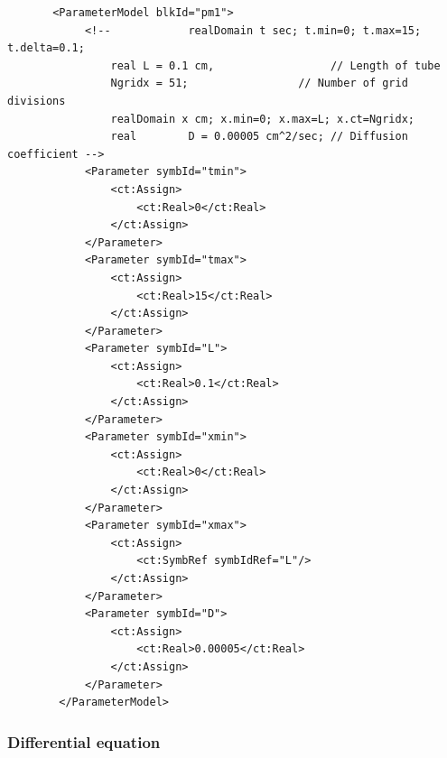 \lstset{language=XML}
\begin{lstlisting}
       <ParameterModel blkId="pm1">            
            <!--            realDomain t sec; t.min=0; t.max=15; t.delta=0.1;
                real L = 0.1 cm,                  // Length of tube
                Ngridx = 51;                 // Number of grid divisions
                realDomain x cm; x.min=0; x.max=L; x.ct=Ngridx;
                real        D = 0.00005 cm^2/sec; // Diffusion coefficient -->
            <Parameter symbId="tmin">
                <ct:Assign>
                    <ct:Real>0</ct:Real>
                </ct:Assign>
            </Parameter>
            <Parameter symbId="tmax">
                <ct:Assign>
                    <ct:Real>15</ct:Real>
                </ct:Assign>
            </Parameter>
            <Parameter symbId="L">
                <ct:Assign>
                    <ct:Real>0.1</ct:Real>
                </ct:Assign>
            </Parameter>
            <Parameter symbId="xmin">
                <ct:Assign>
                    <ct:Real>0</ct:Real>
                </ct:Assign>
            </Parameter>
            <Parameter symbId="xmax">
                <ct:Assign>
                    <ct:SymbRef symbIdRef="L"/>
                </ct:Assign>
            </Parameter>
            <Parameter symbId="D">
                <ct:Assign>
                    <ct:Real>0.00005</ct:Real>
                </ct:Assign>
            </Parameter>
        </ParameterModel>
\end{lstlisting}


\subsubsection*{Differential equation}

